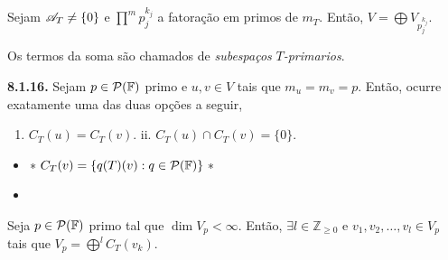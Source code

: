 \begin{theorem}
    \label{thm:8.1.13}
    Sejam \(\mathscr{A}_T\neq \{0\}\) e \(\prod^m p_j^{k_j}\) a fatoração em primos de \(m_T\). Então, \(V= \bigoplus V_{p_j^{k_j}}\). 
\end{theorem}


\begin{note}
    Os termos da soma são chamados de \emph{subespaços} \(T\)\emph{-primarios}.
\end{note}

\hypertarget{lemma8116}{}
\begin{lemma}
    \textbf{8.1.16.} Sejam \(p\in \mathcal{P}(\mathbb{F})\) primo e \(u,v\in V\) tais que \(m_u = m_v = p \). Então, ocurre exatamente uma das duas opções a seguir,
    \begin{enumerate}[label = \roman*., left=2cm]
        \item \(C_T(u) = C_T(v)\). \hspace{2cm} ii. \(C_T(u) \cap C_T(v) = \{0\}\). 
    \end{enumerate} 
\end{lemma}
\begin{itemize}[left=0cm]
    \item[] \(* \ C_T(v) = \{q(T)(v): q \in \Pol\}\ *\)  
    \item[] 
\end{itemize}

\begin{proposition}
    Seja \(p\in \mathcal{P}(\mathbb{F})\) primo tal que \(\dim V_p <\infty \). Então, \(\exists l\in \mathbb{Z}_{\geq 0}\) e \(v_1, v_2, \ldots, v_l \in V_p\) tais que \(V_p = \bigoplus^l C_T(v_k) \). 
\end{proposition}


